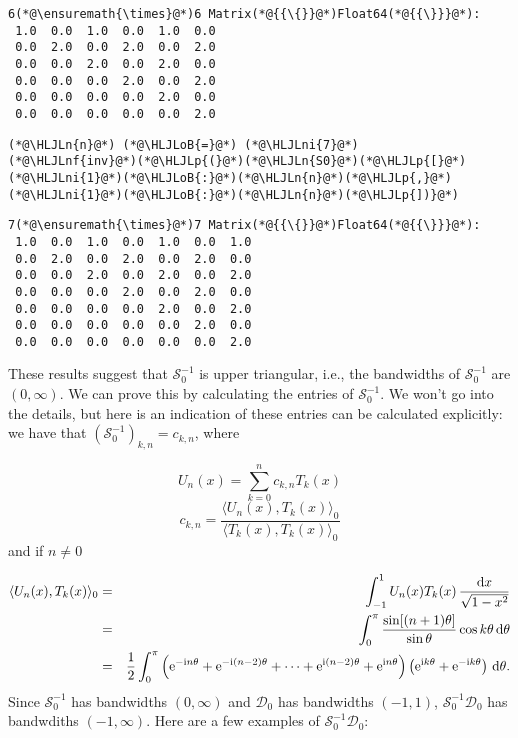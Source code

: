 \documentclass[12pt,a4paper]{article}
\newcommand{\HLJLn}[1]{#1}
\newcommand{\HLJLnf}[1]{\textcolor[RGB]{66,102,213}{#1}}
\newcommand{\HLJLni}[1]{\textcolor[RGB]{59,151,46}{#1}}
\newcommand{\HLJLoB}[1]{\textcolor[RGB]{102,102,102}{\textbf{#1}}}
\newcommand{\HLJLp}[1]{#1}
\begin{document}
\begin{lstlisting}
6(*@\ensuremath{\times}@*)6 Matrix(*@{{\{}}@*)Float64(*@{{\}}}@*):
 1.0  0.0  1.0  0.0  1.0  0.0
 0.0  2.0  0.0  2.0  0.0  2.0
 0.0  0.0  2.0  0.0  2.0  0.0
 0.0  0.0  0.0  2.0  0.0  2.0
 0.0  0.0  0.0  0.0  2.0  0.0
 0.0  0.0  0.0  0.0  0.0  2.0
\end{lstlisting}


\begin{lstlisting}
(*@\HLJLn{n}@*) (*@\HLJLoB{=}@*) (*@\HLJLni{7}@*)
(*@\HLJLnf{inv}@*)(*@\HLJLp{(}@*)(*@\HLJLn{S0}@*)(*@\HLJLp{[}@*)(*@\HLJLni{1}@*)(*@\HLJLoB{:}@*)(*@\HLJLn{n}@*)(*@\HLJLp{,}@*)(*@\HLJLni{1}@*)(*@\HLJLoB{:}@*)(*@\HLJLn{n}@*)(*@\HLJLp{])}@*)
\end{lstlisting}

\begin{lstlisting}
7(*@\ensuremath{\times}@*)7 Matrix(*@{{\{}}@*)Float64(*@{{\}}}@*):
 1.0  0.0  1.0  0.0  1.0  0.0  1.0
 0.0  2.0  0.0  2.0  0.0  2.0  0.0
 0.0  0.0  2.0  0.0  2.0  0.0  2.0
 0.0  0.0  0.0  2.0  0.0  2.0  0.0
 0.0  0.0  0.0  0.0  2.0  0.0  2.0
 0.0  0.0  0.0  0.0  0.0  2.0  0.0
 0.0  0.0  0.0  0.0  0.0  0.0  2.0
\end{lstlisting}


These results suggest that $\mathcal{S}_0^{-1}$ is upper triangular, i.e., the bandwidths of $\mathcal{S}_0^{-1}$ are $(0, \infty)$.   We can prove this by calculating the entries of $\mathcal{S}_0^{-1}$.  We won't go into the details, but here is an indication of these entries can be calculated explicitly: we have that $\left(  \mathcal{S}_0^{-1} \right)_{k,n} = c_{k,n}$, where

\[
U_n(x) = \sum_{k = 0}^{n}c_{k,n}T_k(x)
\]
\[
c_{k,n} = \frac{\langle U_n(x), T_k(x) \rangle_0}{\langle T_k(x), T_k(x) \rangle_0}
\]
and if $n \neq 0$


\begin{eqnarray*}
\langle U_n(x), T_k(x) \rangle_0 &=& \int_{-1}^{1}U_n(x) T_k(x)\,\frac{{\rm d}x}{\sqrt{1-x^2}} \\
&=& \int_{0}^{\pi}  \frac{\sin[(n+1)\theta]}{\sin\theta}\cos k\theta\, {\rm d}\theta \\
&=& \frac{1}{2}\int_{0}^{\pi} \left({\rm e}^{-{\rm i}n\theta} + {\rm e}^{-{\rm i}(n-2)\theta} + \cdots+ {\rm e}^{{\rm i}(n-2)\theta} + {\rm e}^{{\rm i}n\theta}   \right)\left(  {\rm e}^{{\rm i}k\theta} + {\rm e}^{-{\rm i}k\theta}  \right)\,{\rm d}\theta.
\end{eqnarray*}
Since $\mathcal{S}_0^{-1}$ has bandwidths $(0, \infty)$ and $\mathcal{D}_0$ has bandwidths $(-1, 1)$, $\mathcal{S}_0^{-1}\mathcal{D}_0$ has bandwdiths $(-1, \infty)$.   Here are a few examples of $\mathcal{S}_0^{-1}\mathcal{D}_0$:
\end{document}

